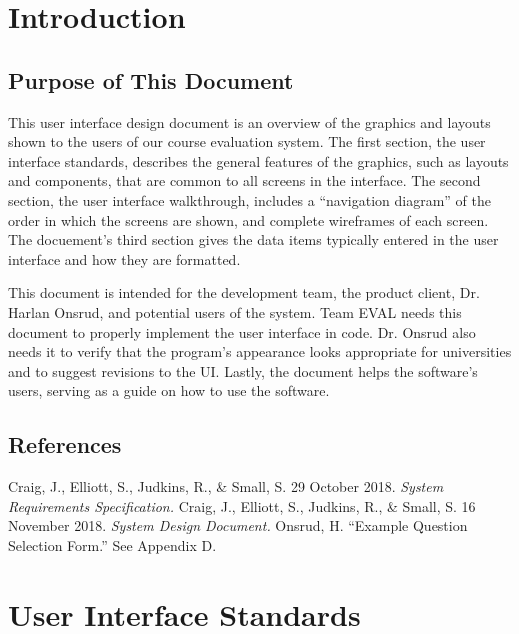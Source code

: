 \documentclass{article}
\begin{document}
\tableofcontents

\newpage

\section{Introduction}
 

\subsection{Purpose of This Document}

This user interface design document is an overview of the graphics and layouts shown to the users of our course evaluation system. The first section, the user interface standards, describes the general features of the graphics, such as layouts and components, that are common to all screens in the interface. The second section, the user interface walkthrough, includes a ``navigation diagram'' of the order in which the screens are shown, and complete wireframes of each screen. The docuement's third section gives the data items typically entered in the user interface and how they are formatted.

This document is intended for the development team, the product client, Dr. Harlan Onsrud, and potential users of the system. Team EVAL needs this document to properly implement the user interface in code. Dr. Onsrud also needs it to verify that the program's appearance looks appropriate for universities and to suggest revisions to the UI. Lastly, the document helps the software's users, serving as a guide on how to use the software.


\subsection{References}

Craig, J., Elliott, S., Judkins, R., \& Small, S. 29 October 2018. \textit{System Requirements Specification.}
\vspace{3mm}\newline
Craig, J., Elliott, S., Judkins, R., \& Small, S. 16 November 2018. \textit{System Design Document.}
\vspace{3mm}\newline
Onsrud, H. ``Example Question Selection Form.'' See Appendix D.

\section{User Interface Standards}
\end{document}
